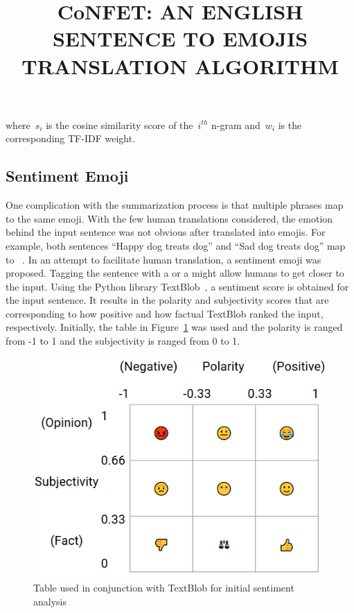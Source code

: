 \documentclass{article}[10]
\newcommand*{\img}[1]{%
  \raisebox{-.3\baselineskip}{%
    \texttt{[image: \#1]}%
  }%
} \title{{CoNFET:} AN ENGLISH SENTENCE TO EMOJIS TRANSLATION ALGORITHM}
\begin{document}
where~\(s_{i}\) is the cosine similarity score of the~\(i^{th}\) n-gram
and~\(w_{i}\) is the corresponding TF-IDF weight.

\subsection{Sentiment Emoji\label{sec:sentimentEmoji}}

One complication with the summarization process is that multiple phrases map to
the same emoji. With the few human translations considered, the emotion behind
the input sentence was not obvious after translated into emojis. For example,
both sentences ``Happy dog treats dog'' and ``Sad dog treats dog'' map
to~\img{emojis/1f415.png}\img{emojis/1f368.png}\img{emojis/1f415.png}. In an
attempt to facilitate human translation, a sentiment emoji was proposed. Tagging
the sentence with a \img{emojis/1f60a.png} or a \img{emojis/1f641.png} might
allow humans to get closer to the input. Using the Python library
TextBlob~\cite{TextBlob}, a sentiment score is obtained for the input sentence.
It results in the polarity and subjectivity scores that are corresponding to how
positive and how factual TextBlob ranked the input, respectively. Initially, the
table in Figure~\ref{fig:sentimentTable} was used and the polarity is ranged
from -1 to 1 and the subjectivity is ranged from 0 to 1.

\begin{figure}[h]
  \begin{center}
    \includegraphics[width=0.70\columnwidth]{figures/sentiment_table1.png}
    \caption{Table used in conjunction with TextBlob for initial sentiment
      analysis\label{fig:sentimentTable}}
  \end{center}
\end{figure}
\end{document}
